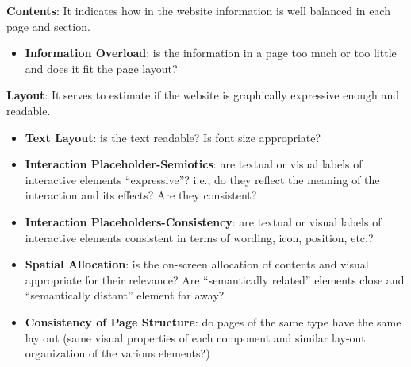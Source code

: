 \textbf{Contents}: It indicates how in the website information is well balanced in each page and section.  
\begin{itemize}
\item \textbf{Information Overload}: is the information in a page too much or too little and does it fit the page layout?
\end{itemize}

\textbf{Layout}: It serves to estimate if the website is graphically expressive enough and readable.
\begin{itemize}
\item \textbf{Text Layout}: is the text readable? Is font size appropriate?
\item \textbf{Interaction Placeholder-Semiotics}: are textual or visual labels of interactive elements “expressive”? i.e., do they reflect the meaning of the interaction and its effects? Are they consistent?
\item \textbf{Interaction Placeholders-Consistency}: are textual or visual labels of interactive elements consistent in terms of wording, icon, position, etc.?
\item \textbf{Spatial Allocation}: is the on-screen allocation of contents and visual appropriate for their relevance? Are “semantically related” elements close and “semantically distant” element far away?
\item \textbf{Consistency of Page Structure}: do pages of the same type have the same lay out (same visual properties of each component and similar lay-out organization of the various elements?)
\end{itemize} 


